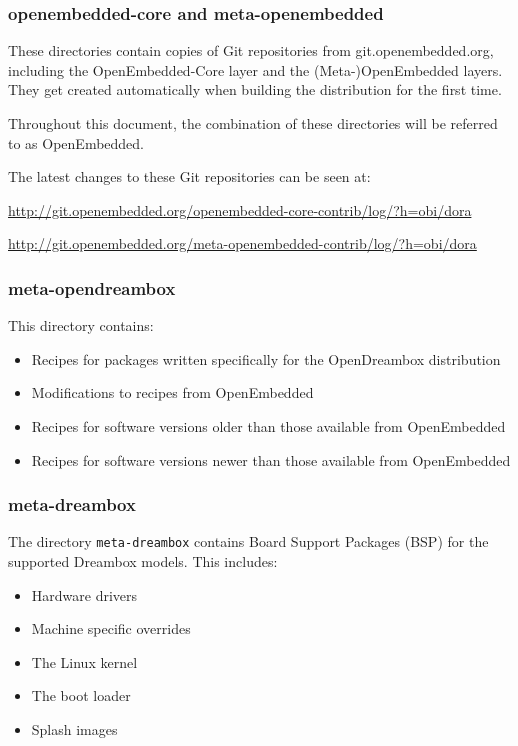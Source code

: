 \documentclass[a4paper]{article}
\newcommand{\shell}[1]{\texttt{\small #1}}
\begin{document}
    \subsubsection{openembedded-core and meta-openembedded}
       These directories contain copies of Git repositories from git.openembedded.org,
       including the OpenEmbedded-Core layer and the (Meta-)OpenEmbedded layers. They
       get created automatically when building the distribution for the first time.

       Throughout this document, the combination of these directories will be
       referred to as OpenEmbedded.

       The latest changes to these Git repositories can be seen at:

       \url{http://git.openembedded.org/openembedded-core-contrib/log/?h=obi/dora}

       \url{http://git.openembedded.org/meta-openembedded-contrib/log/?h=obi/dora}

    \subsubsection{meta-opendreambox}
      This directory contains:

      \begin{itemize}
        \item Recipes for packages written specifically for the OpenDreambox distribution
        \item Modifications to recipes from OpenEmbedded
        \item Recipes for software versions older than those available from OpenEmbedded
        \item Recipes for software versions newer than those available from OpenEmbedded
      \end{itemize}

    \subsubsection{meta-dreambox}
      The directory \shell{meta-dreambox} contains Board Support Packages (BSP)
      for the supported Dreambox models. This includes:

      \begin{itemize}
        \item Hardware drivers
        \item Machine specific overrides
        \item The Linux kernel
        \item The boot loader
        \item Splash images
      \end{itemize}
\end{document}
